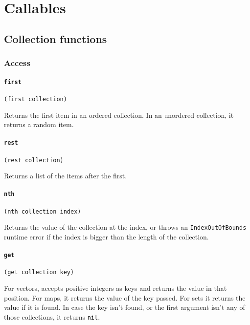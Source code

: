 \documentclass[11pt]{scrreprt}
\begin{document}
\chapter{Callables}
\section{Collection functions}
\subsection{Access}
\subsubsection{\texttt{first}}
\begin{verbatim}
(first collection)
\end{verbatim}
Returns the first item in an ordered collection. In an unordered collection, it returns a random item.

\subsubsection{\texttt{rest}}
\begin{verbatim}
(rest collection)
\end{verbatim}
Returns a list of the items after the first.

\subsubsection{\texttt{nth}}
\begin{verbatim}
(nth collection index)
\end{verbatim}
Returns the value of the collection at the index, or throws an \texttt{IndexOutOfBounds} runtime error if the index is bigger than the length of the collection.

\subsubsection{\texttt{get}}
\begin{verbatim}
(get collection key)
\end{verbatim}
For vectors, accepts positive integers as keys and returns the value in that position. For maps, it returns the value of the key passed. For sets it returns the value if it is found. In case the key isn't found, or the first argument isn't any of those collections, it returns \texttt{nil}.
\end{document}

